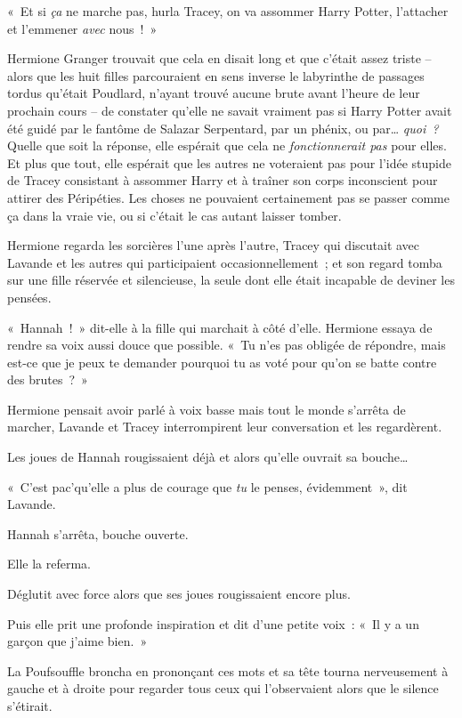 «~Et si \emph{ça} ne marche pas, hurla Tracey, on va assommer Harry Potter, l'attacher et l'emmener \emph{avec} nous~!~»

\later

Hermione Granger trouvait que cela en disait long et que c'était assez triste -- alors que les huit filles parcouraient en sens inverse le labyrinthe de passages tordus qu'était Poudlard, n'ayant trouvé aucune brute avant l'heure de leur prochain cours -- de constater qu'elle ne savait vraiment pas si Harry Potter avait été guidé par le fantôme de Salazar Serpentard, par un phénix, ou par…
\emph{quoi~?} Quelle que soit la réponse, elle espérait que cela ne \emph{fonctionnerait pas} pour elles.
Et plus que tout, elle espérait que les autres ne voteraient pas pour l'idée stupide de Tracey consistant à assommer Harry et à traîner son corps inconscient pour attirer des Péripéties.
Les choses ne pouvaient certainement pas se passer comme ça dans la vraie vie, ou si c'était le cas autant laisser tomber.

Hermione regarda les sorcières l'une après l'autre, Tracey qui discutait avec Lavande et les autres qui participaient occasionnellement~; et son regard tomba sur une fille réservée et silencieuse, la seule dont elle était incapable de deviner les pensées.

«~Hannah~!~»
dit-elle à la fille qui marchait à côté d'elle.
Hermione essaya de rendre sa voix aussi douce que possible.
«~Tu n'es pas obligée de répondre, mais est-ce que je peux te demander pourquoi tu as voté pour qu'on se batte contre des brutes~?~»

Hermione pensait avoir parlé à voix basse mais tout le monde s'arrêta de marcher, Lavande et Tracey interrompirent leur conversation et les regardèrent.

Les joues de Hannah rougissaient déjà et alors qu'elle ouvrait sa bouche…

«~C'est pac'qu'elle a plus de courage que \emph{tu} le penses, évidemment~», dit Lavande.

Hannah s'arrêta, bouche ouverte.

Elle la referma.

Déglutit avec force alors que ses joues rougissaient encore plus.

Puis elle prit une profonde inspiration et dit d'une petite voix~: «~Il y a un garçon que j'aime bien.~»

La Poufsouffle broncha en prononçant ces mots et sa tête tourna nerveusement à gauche et à droite pour regarder tous ceux qui l'observaient alors que le silence s'étirait.


